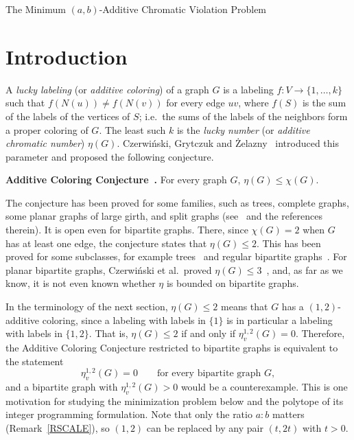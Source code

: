\documentclass[a4paper,11pt]{article}
\newcommand{\ie}{{i.e.~}}
\theoremstyle{definition}
\begin{document}
\begin{center}
\huge The Minimum $(a,b)$-Additive Chromatic Violation Problem
\end{center}

\section*{Introduction}

A \emph{lucky labeling} (or \emph{additive coloring}) of a graph $G$ is a labeling $f : V \to \{1, \ldots, k\}$ such that
$f(N(u)) \neq f(N(v))$ for every edge $uv$, where $f(S)$ is the sum of the labels of the vertices of $S$; \ie the sums of the
labels of the neighbors form a proper coloring of $G$. The least such $k$ is the \emph{lucky number} (or \emph{additive chromatic number}) $\eta(G)$. Czerwi\'nski, Grytczuk and
\.Zelazny~\cite{CGZ09} introduced this parameter and proposed the following conjecture.

\medskip
\noindent\textbf{Additive Coloring Conjecture~\cite{CGZ09}.} For every graph $G$, $\eta(G) \leq \chi(G)$.
\medskip

The conjecture has been proved for some families, such as trees, complete graphs, some planar graphs of large girth, and split
graphs (see~\cite{Sev20} and the references therein). It is open even for bipartite graphs. There, since $\chi(G) = 2$ when
$G$ has at least one edge, the conjecture states that $\eta(G) \leq 2$. This has been proved for some subclasses, for example trees~\cite{CGZ09}
and regular bipartite graphs~\cite{Sev20}. For planar bipartite graphs, Czerwi\'nski et al.~proved $\eta(G) \leq 3$~\cite{CGZ09}, and, as far as we
know, it is not even known whether $\eta$ is bounded on bipartite graphs.

In the terminology of the next section, $\eta(G) \leq 2$ means that $G$ has a $(1,2)$-additive coloring, since a labeling with
labels in $\{1\}$ is in particular a labeling with labels in $\{1,2\}$. That is, $\eta(G) \leq 2$ if and only if $\eta_v^{1,2}(G) = 0$. Therefore,
the Additive Coloring Conjecture restricted to bipartite graphs is equivalent to the statement
$$\eta_v^{1,2}(G) = 0 \qquad \textrm{for every bipartite graph } G,$$
and a bipartite graph with $\eta_v^{1,2}(G) > 0$ would be a counterexample. This is one motivation for studying the minimization
problem below and the polytope of its integer programming formulation. Note that only the ratio $a : b$ matters (Remark~\ref{RSCALE}), so
$(1,2)$ can be replaced by any pair $(t, 2t)$ with $t > 0$.
\end{document}
